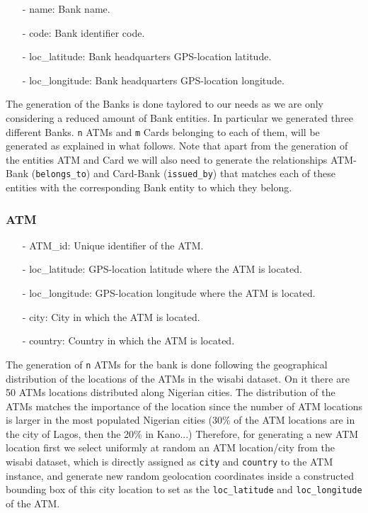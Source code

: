 \documentclass{article}
\begin{document}
\begin{itemize}
\item[-] name: Bank name.
\item[-] code: Bank identifier code.
\item[-] loc\_latitude: Bank headquarters GPS-location latitude.
\item[-] loc\_longitude: Bank headquarters GPS-location longitude.
\end{itemize} 

The generation of the Banks is done taylored to our needs as we are only considering a 
reduced amount of Bank entities. In particular we generated three different Banks. 
\texttt{n} ATMs and \texttt{m} Cards belonging to each of them, will be generated as 
explained in what follows. Note that apart from the generation of the entities ATM and 
Card we will also need to generate the relationships ATM-Bank (\texttt{belongs\_to}) and 
Card-Bank (\texttt{issued\_by}) that matches each of these entities with the corresponding 
Bank entity to which they belong. 

\subsubsection*{ATM}

\begin{itemize}
\item[-] ATM\_id: Unique identifier of the ATM.
\item[-] loc\_latitude: GPS-location latitude where the ATM is located.
\item[-] loc\_longitude: GPS-location longitude where the ATM is located.
\item[-] city: City in which the ATM is located.
\item[-] country: Country in which the ATM is located.
\end{itemize}

The generation of \texttt{n} ATMs for the bank is done following
the geographical distribution of the locations of the ATMs in the wisabi dataset. On it there are 50 ATMs
locations distributed along Nigerian cities. The distribution of the ATMs matches the
importance of the location since the number of ATM locations is larger in the most populated 
Nigerian cities (30\% of the ATM locations are in the city of Lagos, then the 20\% in 
Kano...) Therefore, for generating a new ATM location first we select uniformly at 
random an ATM location/city from the wisabi dataset, which is directly assigned as 
\texttt{city} and \texttt{country} to the ATM instance, and generate new random 
geolocation coordinates inside a constructed bounding box of this city location to set 
as the \texttt{loc\_latitude} and \texttt{loc\_longitude} of the ATM.
\end{document}
